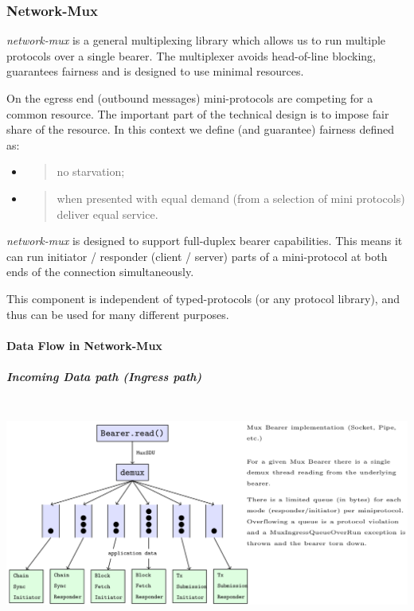 \documentclass[11pt,a4paper]{article}
\begin{document}
\subsubsection{Network-Mux}
\label{network-mux}

\emph{network-mux} is a general multiplexing library which allows us to
run multiple protocols over a single bearer. The multiplexer avoids
head-of-line blocking, guarantees fairness and is designed to use
minimal resources.

On the egress end (outbound messages) mini-protocols are competing for a
common resource. The important part of the technical design is to impose
fair share of the resource. In this context we define (and guarantee)
fairness defined as:

\begin{itemize}
\item
  \begin{quote}
  no starvation;
  \end{quote}
\item
  \begin{quote}
  when presented with equal demand (from a selection of mini protocols)
  deliver equal service.
  \end{quote}
\end{itemize}

\emph{network-mux} is designed to support full-duplex bearer
capabilities. This means it can run initiator / responder (client /
server) parts of a mini-protocol at both ends of the connection
simultaneously.

This component is independent of typed-protocols (or any protocol
library), and thus can be used for many different purposes.

\paragraph{Data Flow in Network-Mux}

\subparagraph{Incoming Data path (Ingress path)}

\includegraphics[width=6.27083in,height=2.875in]{./media/image2.png}
\end{document}
